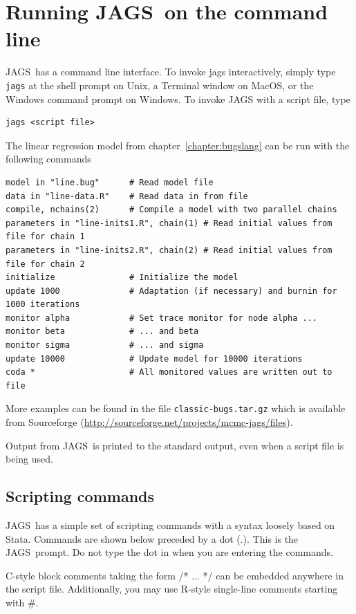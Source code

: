 \documentclass[11pt, a4paper, titlepage]{report}
\newcommand{\JAGS}{\textsf{JAGS}}
\newcommand{\R}{\textsf{R}}
\begin{document}
\chapter{Running \JAGS\ on the command line}
\label{chapter:cmdline}

\JAGS\ has a command line interface. To invoke jags interactively,
simply type \texttt{jags} at the shell prompt on Unix, a Terminal
window on MacOS, or the Windows command prompt on Windows. To invoke
JAGS with a script file, type
\begin{verbatim}
jags <script file>
\end{verbatim}
The linear regression model from chapter~\ref{chapter:bugslang} can
be run with the following commands
\begin{verbatim}
model in "line.bug"      # Read model file
data in "line-data.R"    # Read data in from file
compile, nchains(2)      # Compile a model with two parallel chains
parameters in "line-inits1.R", chain(1) # Read initial values from file for chain 1
parameters in "line-inits2.R", chain(2) # Read initial values from file for chain 2
initialize               # Initialize the model
update 1000              # Adaptation (if necessary) and burnin for 1000 iterations
monitor alpha            # Set trace monitor for node alpha ...
monitor beta             # ... and beta
monitor sigma            # ... and sigma
update 10000             # Update model for 10000 iterations
coda *                   # All monitored values are written out to file
\end{verbatim}
More examples can be found in the file \verb+classic-bugs.tar.gz+
which is available from Sourceforge
(\url{http://sourceforge.net/projects/mcmc-jags/files}).

Output from \JAGS\ is printed to the standard output, even when a
script file is being used.  

\section{Scripting commands}
\label{section:scripting}

\JAGS\ has a simple set of scripting commands with a syntax loosely
based on \textsf{Stata}. Commands are shown below preceded by a dot
(.). This is the \JAGS\ prompt. Do not type the dot in when you are
entering the commands.

C-style block comments taking the form /* ... */ can be
embedded anywhere in the script file.  Additionally, you may use
\R-style single-line comments starting with \#.
\end{document}
